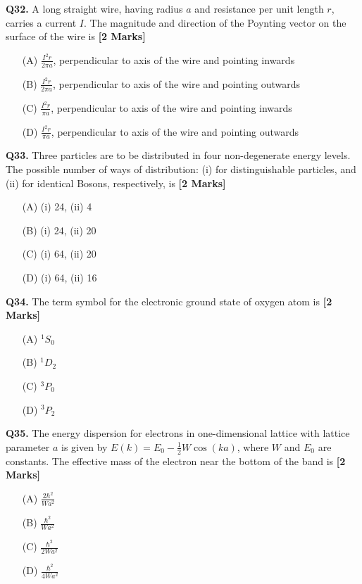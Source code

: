\documentclass[11pt]{article}
\newcommand{\questionb}[2]{
    \noindent\textbf{Q#2.} #1 \hfill \textbf{[2 Marks]}
}
\begin{document}
\questionb{A long straight wire, having radius \(a\) and resistance per unit length \(r\), carries a current \(I\). The magnitude and direction of the Poynting vector on the surface of the wire is}{32}
\begin{enumerate}
    \item[(A)] \(\frac{I^2 r}{2\pi a}\), perpendicular to axis of the wire and pointing inwards  
    \item[(B)] \(\frac{I^2 r}{2\pi a}\), perpendicular to axis of the wire and pointing outwards  
    \item[(C)] \(\frac{I^2 r}{\pi a}\), perpendicular to axis of the wire and pointing inwards  
    \item[(D)] \(\frac{I^2 r}{\pi a}\), perpendicular to axis of the wire and pointing outwards  
\end{enumerate}
\vspace{0.5cm}

\questionb{Three particles are to be distributed in four non-degenerate energy levels. The possible number of ways of distribution: (i) for distinguishable particles, and (ii) for identical Bosons, respectively, is}{33}
\begin{enumerate}
    \item[(A)] (i) 24, (ii) 4  
    \item[(B)] (i) 24, (ii) 20  
    \item[(C)] (i) 64, (ii) 20  
    \item[(D)] (i) 64, (ii) 16  
\end{enumerate}
\vspace{0.5cm}

\questionb{The term symbol for the electronic ground state of oxygen atom is}{34}
\begin{enumerate}
    \item[(A)] \(^1S_0\)  
    \item[(B)] \(^1D_2\)  
    \item[(C)] \(^3P_0\)  
    \item[(D)] \(^3P_2\)  
\end{enumerate}
\vspace{0.5cm}

\questionb{The energy dispersion for electrons in one-dimensional lattice with lattice parameter \(a\) is given by \(E(k) = E_0 - \frac{1}{2} W \cos(ka)\), where \(W\) and \(E_0\) are constants. The effective mass of the electron near the bottom of the band is}{35}
\begin{enumerate}
    \item[(A)] \(\frac{2\hbar^2}{W a^2}\)  
    \item[(B)] \(\frac{\hbar^2}{W a^2}\)  
    \item[(C)] \(\frac{\hbar^2}{2W a^2}\)  
    \item[(D)] \(\frac{\hbar^2}{4W a^2}\)  
\end{enumerate}
\vspace{0.5cm}
\end{document}
